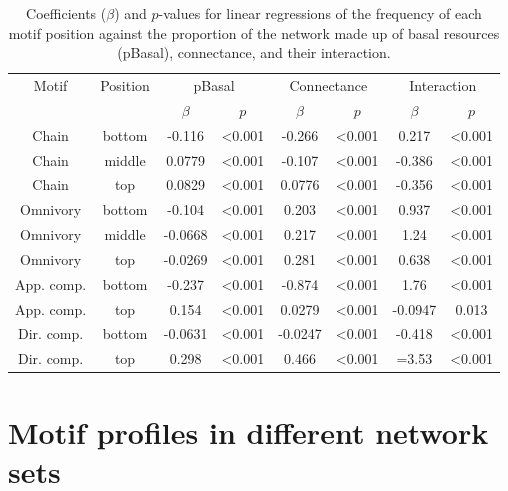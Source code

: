 \documentclass[12pt]{article}
\begin{document}
\begin{spacing}{2.0}
        \begin{table}[h!]
            \caption{Coefficients ($\beta$) and $p$-values for linear regressions of the frequency of each motif position against the proportion of the network made up of basal resources (pBasal), connectance, and their interaction.}
            \label{BC_tab}
            \footnotesize
            \begin{tabular}{c c | c c | cc | cc |}
            Motif & Position & \multicolumn{2}{c}{pBasal} & \multicolumn{2}{c}{Connectance} & \multicolumn{2}{c}{Interaction} \\
            & & $\beta$ & $p$ & $\beta$ & $p$ & $\beta$ & $p$ \\
            \hline
            Chain & bottom & -0.116 & \textless0.001 & -0.266 & \textless0.001 & 0.217 & \textless0.001 \\
            Chain & middle & 0.0779 & \textless0.001 & -0.107 & \textless0.001 & -0.386 & \textless0.001 \\
            Chain & top & 0.0829 & \textless0.001 & 0.0776 & \textless0.001 & -0.356 & \textless0.001 \\
            \hline
            Omnivory & bottom & -0.104 & \textless0.001 & 0.203 & \textless0.001 & 0.937 & \textless0.001 \\
            Omnivory & middle & -0.0668 & \textless0.001 & 0.217 & \textless0.001 & 1.24 & \textless0.001 \\
            Omnivory & top & -0.0269 & \textless0.001 & 0.281 & \textless0.001 & 0.638 & \textless0.001 \\
            \hline
            App. comp. & bottom & -0.237 & \textless0.001 & -0.874 & \textless0.001 & 1.76 & \textless0.001 \\
            App. comp. & top & 0.154 & \textless0.001 & 0.0279 & \textless0.001 & -0.0947 & 0.013 \\
            \hline
            Dir. comp. & bottom & -0.0631 & \textless0.001 & -0.0247 & \textless0.001 & -0.418 & \textless0.001 \\
            Dir. comp. & top & 0.298 & \textless0.001 & 0.466 & \textless0.001 & =3.53 & \textless0.001 \\
            \hline
            \end{tabular}
            \end{table}

    
\clearpage        

\section{Motif profiles in different network sets}


\end{spacing}
\end{document}
